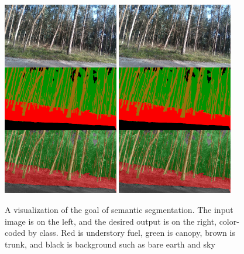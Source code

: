 \begin{figure}
    \centering
    \includegraphics[width=0.45\textwidth, trim={0 340px 0 0}, clip]{figs/background/automated_understanding/segmentation_example.png}
    \includegraphics[width=0.45\textwidth, trim={0 170 0 170}, clip]{figs/background/automated_understanding/segmentation_example.png}
    \caption{A visualization of the goal of semantic segmentation. The input image is on the left, and the desired output is on the right, color-coded by class. Red is understory fuel, green is canopy, brown is trunk, and black is background such as bare earth and sky}
    \label{fig:background:semantic_seg_example}
\end{figure}

